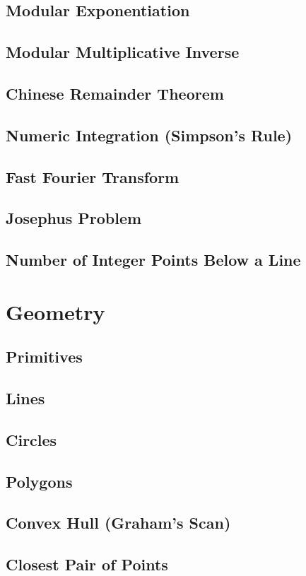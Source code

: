 \documentclass[8pt,a4paper,landscape,oneside]{amsart}
\begin{document}
\begin{multicols*}{3}
	\subsection{Modular Exponentiation}
	\subsection{Modular Multiplicative Inverse}
	\subsection{Chinese Remainder Theorem}
	\subsection{Numeric Integration (Simpson's Rule)}
	\subsection{Fast Fourier Transform}
	\subsection{Josephus Problem}
	\subsection{Number of Integer Points Below a Line}
\section{Geometry}
	\subsection{Primitives}
	\subsection{Lines}
	\subsection{Circles}
	\subsection{Polygons}
	\subsection{Convex Hull (Graham's Scan)}
	\subsection{Closest Pair of Points}

\end{multicols*}
\end{document}
